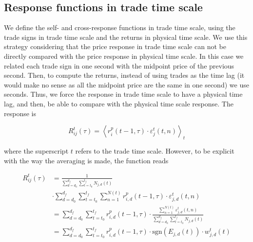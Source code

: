 \subsection{Response functions in trade time scale}
\label{subsec:response_function_trade}

We define the self- and cross-response functions in trade time scale, using the
trade signs in trade time scale and the returns in physical time scale. We use
this strategy considering that the price response in trade time scale can not
be directly compared with the price response in physical time scale. In this
case we related each trade sign in one second with the midpoint price of the
previous second. Then, to compute the returns, instead of using trades as the
time lag (it would make no sense as all the midpoint price are the same in one
second) we use seconds. Thus, we force the response in trade time scale to have
a physical time lag, and then, be able to compare with the physical time scale
response. The response is

\begin{equation}\label{eq:response_functions_trade_scale_general}
    R^{t}_{ij}\left(\tau\right)=\left\langle r^{p}_{i}\left(t-1,\tau
    \right)\cdot\varepsilon_{j}^{t} \left(t, n\right)\right\rangle _{t}
\end{equation}

where the superscript $t$ refers to the trade time scale. However, to be
explicit with the way the averaging is made, the function reads

\begin{align}\label{eq:response_trades_explicit}
    R_{ij}^{t}\left(\tau\right)&=\frac{1}{\sum_{d=d_{0}}^{d_{f}}
    \sum_{t=t_{0}}^{t_{f}}N_{j,d} \left(t \right)} \nonumber \\
    &\cdot\sum_{d=d_{0}}^{d_{f}}\sum_{t=t_{0}}^{t_{f}}\sum_{n=1}
    ^{N\left(t\right)} r^{p}_{i,d}\left(t-1, \tau\right)\cdot
    \varepsilon_{j,d}^{t}\left(t,n\right)\\
    &=\sum_{d=d_{0}}^{d_{f}}\sum_{t=t_{0}}^{t_{f}} r^{p}_{i,d}
    \left(t-1,\tau\right) \cdot\frac{\sum_{n=1}^{N\left(t\right)}
    \varepsilon_{j,d}^{t}\left(t,n \right)} {\sum_{d=d_{0}}^{d_{f}}
    \sum_{t=t_{0}}^{t_{f}}N_{j,d}\left(t\right)} \nonumber \\
    &=\sum_{d=d_{0}}^{d_{f}}\sum_{t=t_{0}}^{t_{f}}r^{p}_{i,d}
    \left(t-1,\tau\right) \cdot \text{sgn}\left(E_{j,d}\left(t\right)\right)
    \cdot w_{j,d}^{t}\left(t\right)
\end{align}

